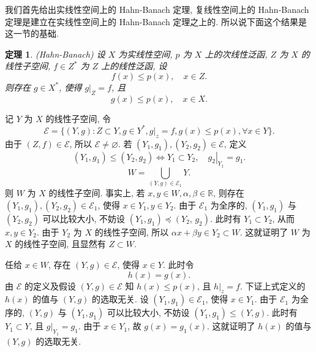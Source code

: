 \documentclass[openany]{ctexbook}
\makeatletter
\theoremstyle{kaiti}
\newtheorem{theorem}{定理}[section]
\theoremstyle{normal}
\renewenvironment{proof}[1][\proofname]{\par
    \pushQED{\qed}%
    \normalfont \topsep6\p@\@plus6\p@\relax
    \trivlist
    \item\relax
    {\heiti #1}\hspace{2\labelsep}\ignorespaces
  }{%
    \popQED\endtrivlist\@endpefalse
  }
\makeatother
\begin{document}
我们首先给出实线性空间上的 Hahn-Banach 定理, 复线性空间上的 Hahn-Banach 定理是建立在实线性空间上的 Hahn-Banach 定理之上的. 所以说下面这个结果是这一节的基础.

\begin{theorem}
(Hahn-Banach) 设 $X$ 为实线性空间, $p$ 为 $X$ 上的次线性泛函, $Z$ 为 $X$ 的线性子空间, $f \in Z^{*}$ 为 $Z$ 上的线性泛函, 设
$$
f(x) \leqslant p(x), \quad x \in Z.
$$
则存在 $g \in X^{*}$, 使得 $\left.g\right|_{Z}=f$, 且
$$
g(x) \leqslant p(x), \quad x \in X.
$$
\end{theorem}

\begin{proof}
记 $Y$ 为 $X$ 的线性子空间, 令
\begin{equation}
  \mathcal{E}=\{(Y, g): Z \subset Y, g \in Y^{*}, g|_z=f, g(x) \leqslant p(x), \forall x \in Y\}.
\end{equation}
由于 $(Z, f) \in \mathcal{E}$, 所以 $\mathcal{E} \neq \varnothing$. 若 $\left(Y_1, g_1\right),\left(Y_2, g_2\right) \in \mathcal{E}$, 定义
$$
\left(Y_1, g_1\right) \leqslant\left(Y_2, g_2\right) \Leftrightarrow Y_1 \subset Y_2,\left.\quad g_2\right|_{Y_1}=g_1.
$$
$$
W=\bigcup_{(Y, g) \in \mathcal{E}_1} Y.
$$
则 $W$ 为 $X$ 的线性子空间. 事实上, 若 $x, y \in W, \alpha, \beta \in \mathbb{R}$, 则存在 $\left(Y_1, g_1\right),\left(Y_2, g_2\right) \in \mathcal{E}_1$, 使得 $x \in Y_1, y \in Y_2$. 由于 $\mathcal{E}_1$ 为全序的, $\left(Y_1, g_1\right)$ 与 $\left(Y_2, g_2\right)$ 可以比较大小, 不妨设 $\left(Y_1, g_1\right) \preccurlyeq\left(Y_2\right.$, $\left.g_2\right)$. 此时有 $Y_1 \subset Y_2$, 从而 $x, y \in Y_2$. 由于 $Y_2$ 为 $X$ 的线性子空间, 所以 $\alpha x+\beta y \in Y_2 \subset W$. 这就证明了 $W$ 为 $X$ 的线性子空间, 且显然有 $Z \subset W$.

任给 $x \in W$, 存在 $(Y, g) \in \mathcal{E}$, 使得 $x \in Y$. 此时令
$$
h(x)=g(x).
$$
由 $\mathcal{E}$ 的定义及假设 $(Y, g) \in \mathcal{E}$ 知 $h(x) \leqslant p(x)$, 且 $\left.h\right|_{z}=f$. 下证上式定义的 $h(x)$ 的值与 $(Y, g)$ 的选取无关. 设 $\left(Y_1, g_1\right) \in \mathcal{E}_1$, 使得 $x \in Y_1$. 由于 $\mathcal{E}_1$ 为全序的, $(Y, g)$ 与 $\left(Y_1, g_1\right)$ 可以比较大小, 不妨设 $\left(Y_1, g_1\right) \leqslant(Y, g)$. 此时有 $Y_1 \subset Y$, 且 $\left.g\right|_{Y_1}=g_1$. 由于 $x \in Y_1$, 故 $g(x)=g_1(x)$. 这就证明了 $h(x)$ 的值与 $(Y, g)$ 的选取无关.


\end{proof}
\end{document}

